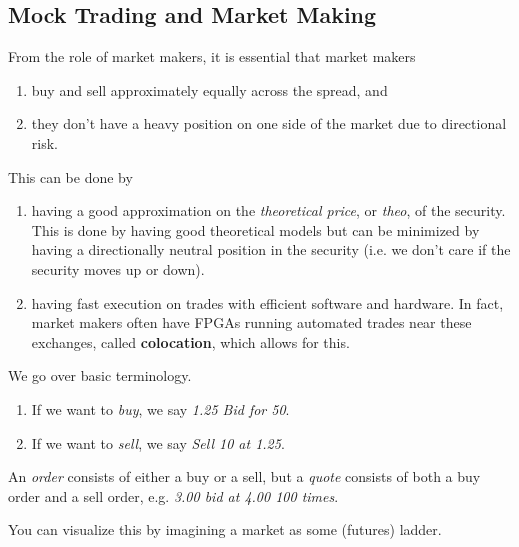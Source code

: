 \documentclass{article}
\begin{document}
  \subsection{Mock Trading and Market Making}

    From the role of market makers, it is essential that market makers  
    \begin{enumerate}
      \item buy and sell approximately equally across the spread, and 
      \item they don't have a heavy position on one side of the market due to directional risk. 
    \end{enumerate}
    This can be done by 
    \begin{enumerate}
      \item having a good approximation on the \textit{theoretical price}, or \textit{theo}, of the security. This is done by having good theoretical models but can be minimized by having a directionally neutral position in the security (i.e. we don't care if the security moves up or down). 
      \item having fast execution on trades with efficient software and hardware. In fact, market makers often have FPGAs running automated trades near these exchanges, called \textbf{colocation}, which allows for this.  
    \end{enumerate}

    We go over basic terminology. 
    \begin{enumerate}
      \item If we want to \textit{buy}, we say \textit{1.25 Bid for 50}. 
      \item If we want to \textit{sell}, we say \textit{Sell 10 at 1.25}. 
    \end{enumerate}
    An \textit{order} consists of either a buy or a sell, but a \textit{quote} consists of both a buy order and a sell order, e.g. \textit{3.00 bid at 4.00 100 times}. 

    You can visualize this by imagining a market as some (futures) ladder. 
\end{document}
